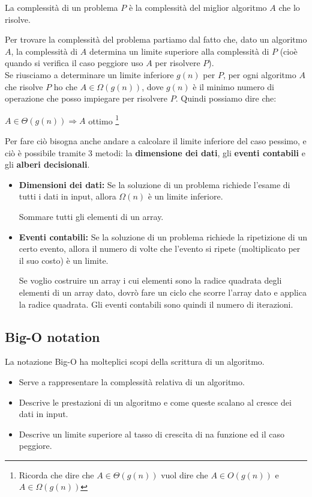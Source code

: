 \begin{definition}
    La complessità di un problema $P$ è la complessità del miglior algoritmo $A$ che lo risolve.
\end{definition}
Per trovare la complessità del problema partiamo dal fatto che, dato un algoritmo $A$, la complessità di $A$ determina un limite superiore alla complessità di $P$ (cioè quando si verifica il caso peggiore uso $A$ per risolvere $P$).\\
Se riusciamo a determinare un limite inferiore $g(n)$ per $P$, per ogni algoritmo $A$ che risolve $P$ ho che $A \in \Omega(g(n))$, dove $g(n)$ è il minimo numero di operazione che posso impiegare per risolvere $P$. Quindi possiamo dire che:
\begin{center}
    $A \in \Theta(g(n)) \Longrightarrow A$ ottimo \footnote{Ricorda che dire che $A \in \Theta(g(n))$ vuol dire che $A \in O(g(n))$ e $A \in \Omega(g(n))$}
\end{center}
Per fare ciò bisogna anche andare a calcolare il limite inferiore del caso pessimo, e ciò è possibile tramite 3 metodi: la \textbf{dimensione dei dati}, gli \textbf{eventi contabili} e gli \textbf{alberi decisionali}.

\begin{itemize}
    \item \textbf{Dimensioni dei dati:} Se la soluzione di un problema richiede l'esame di tutti i dati in input, allora $\Omega(n)$ è un limite inferiore.
    \begin{example}
    	Sommare tutti gli elementi di un array.
    \end{example}
\end{itemize}
\begin{itemize}
    \item \textbf{Eventi contabili:} Se la soluzione di un problema richiede la ripetizione di un certo evento, allora il numero di volte che l'evento si ripete (moltiplicato per il suo costo) è un limite.
    \begin{example}
    	Se voglio costruire un array i cui elementi sono la radice quadrata degli elementi di un array dato, dovrò fare un ciclo che scorre l'array dato e applica la radice quadrata. Gli eventi contabili sono quindi il numero di iterazioni.
    \end{example}
\end{itemize}

\subsection{Big-O notation}
La notazione Big-O ha molteplici scopi della scrittura di un algoritmo.
\begin{itemize}
    \item Serve a rappresentare la complessità relativa di un algoritmo.
    \item Descrive le prestazioni di un algoritmo e come queste scalano al cresce dei dati in input.
    \item Descrive un limite superiore al tasso di crescita di na funzione ed il caso peggiore.
\end{itemize}

